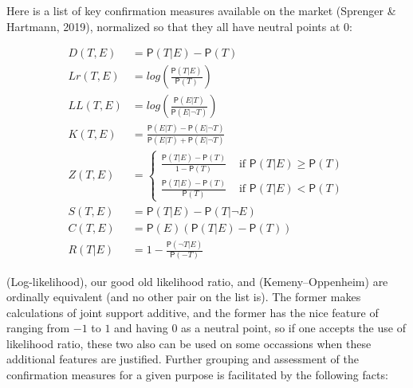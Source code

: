 \documentclass[
  10pt,
  dvipsnames,enabledeprecatedfontcommands]{scrartcl}
\newcommand{\n}{\neg}
\newcommand{\pr}[1]{\mathsf{P}(#1)}
\begin{document}
Here is a list of key confirmation measures available on the market
(Sprenger \& Hartmann, 2019), normalized so that they all have neutral
points at 0:

\begin{align}
\tag{Difference}  D(T,E) & = \pr{T\vert E} - \pr{T}\\
\tag{Log-ratio}  Lr(T,E) &  = log\left(\frac{\pr{T\vert E}}{\pr{T}} \right) \\
\tag{Log-likelihood}   LL(T,E) & = log\left(\frac{\pr{E \vert T}}{\pr{E \vert \n T}} \right)\\
\tag{Kemeny-Oppenheim}  K(T,E) & = \frac{\pr{E\vert T} - \pr{E \vert \n T}}{\pr{E \vert T} + \pr{E \vert \n T}} \\
\tag{Generalized entailment}  Z(T,E) & = \begin{cases}
\frac{\pr{T\vert E} - \pr{T}}{1-\pr{T}} & \mbox{ if } \pr{T \vert E} \geq \pr{T}\\
\frac{\pr{T\vert E} - \pr{T}}{\pr{T}} & \mbox{ if } \pr{T \vert E} < \pr{T}
\end{cases} \\
\tag{Christensen-Joyce} S(T,E) & = \pr{T \vert E} - \pr{T \vert \n E} \\
\tag{Carnap}  C(T,E) & = \pr{E}(\pr{T\vert E} - \pr{T})\\
\tag{Rips} R(T\vert E) & = 1 - \frac{\pr{\n T\vert E}}{\pr{-T}}
\end{align}

(Log-likelihood), our good old likelihood ratio, and (Kemeny--Oppenheim)
are ordinally equivalent (and no other pair on the list is). The former
makes calculations of joint support additive, and the former has the
nice feature of ranging from \(-1\) to \(1\) and having 0 as a neutral
point, so if one accepts the use of likelihood ratio, these two also can
be used on some occassions when these additional features are justified.
Further grouping and assessment of the confirmation measures for a given
purpose is facilitated by the following facts:
\end{document}
